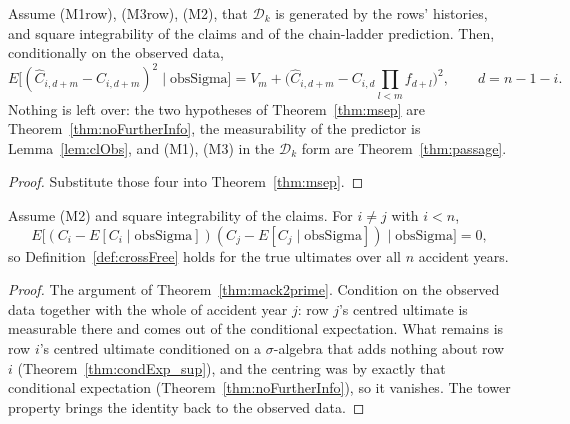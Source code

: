 \begin{theorem}\label{thm:msepRows}\leanok
{}
Assume (M1row), (M3row), (M2), that $\mathcal{D}_k$ is generated by the rows' histories, and square
integrability of the claims and of the chain-ladder prediction. Then, conditionally on the observed
data,
\[
  E\big[(\hat C_{i,d+m} - C_{i,d+m})^2 \mid \mathrm{obsSigma}\big]
  = V_m + \big(\hat C_{i,d+m} - C_{i,d}\textstyle\prod_{l<m} f_{d+l}\big)^2 ,
  \qquad d = n-1-i .
\]
Nothing is left over: the two hypotheses of Theorem~\ref{thm:msep} are
Theorem~\ref{thm:noFurtherInfo}, the measurability of the predictor is Lemma~\ref{lem:clObs}, and
(M1), (M3) in the $\mathcal{D}_k$ form are Theorem~\ref{thm:passage}.
\end{theorem}
\begin{proof}\leanok Substitute those four into Theorem~\ref{thm:msep}. \end{proof}

\begin{theorem}\label{thm:crossFree}\leanok
{}
Assume (M2) and square integrability of the claims. For $i \ne j$ with $i < n$,
\[
  E\big[(C_i - E[C_i \mid \mathrm{obsSigma}])(C_j - E[C_j \mid \mathrm{obsSigma}])
  \;\big|\; \mathrm{obsSigma}\big] = 0 ,
\]
so Definition~\ref{def:crossFree} holds for the true ultimates over all $n$ accident years.
\end{theorem}
\begin{proof}\leanok
The argument of Theorem~\ref{thm:mack2prime}. Condition on the observed data together with the whole
of accident year $j$: row $j$'s centred ultimate is measurable there and comes out of the
conditional expectation. What remains is row $i$'s centred ultimate conditioned on a
$\sigma$-algebra that adds nothing about row $i$ (Theorem~\ref{thm:condExp_sup}), and the centring
was by exactly that conditional expectation (Theorem~\ref{thm:noFurtherInfo}), so it vanishes. The
tower property brings the identity back to the observed data.
\end{proof}

